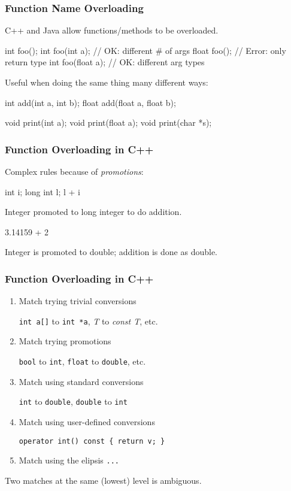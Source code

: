 \documentclass{plt}
\begin{document}
\begin{frame}[fragile]
  \frametitle{Function Name Overloading}

C++ and Java allow functions/methods to be overloaded.

\begin{C++}
int   foo();
int   foo(int a);   // OK: different # of args
float foo();        // Error: only return type
int   foo(float a); // OK: different arg types
\end{C++}

Useful when doing the same thing many different ways:

\begin{C++}
int add(int a, int b);
float add(float a, float b);

void print(int a);
void print(float a);
void print(char *s);
\end{C++}

\end{frame}

\begin{frame}[fragile]
  \frametitle{Function Overloading in C++}

Complex rules because of \emph{promotions}:

\begin{C++}
int i;
long int l;
l + i
\end{C++}

Integer promoted to long integer to do addition.

\begin{C++}
3.14159 + 2
\end{C++}

Integer is promoted to double; addition is done as double.

\end{frame}

\begin{frame}[fragile]
  \frametitle{Function Overloading in C++}

\begin{enumerate}
\item Match trying trivial conversions

\verb|int a[]| to \verb|int *a|, \emph{T} to \emph{const T}, etc.

\item Match trying promotions

\verb|bool| to \verb|int|, \verb|float| to \verb|double|, etc.

\item Match using standard conversions

\verb|int| to \verb|double|, \verb|double| to \verb|int|

\item Match using user-defined conversions

\verb|operator int() const { return v; }|

\item Match using the elipsis \verb|...|

\end{enumerate}

Two matches at the same (lowest) level is ambiguous.

\end{frame}
\end{document}
